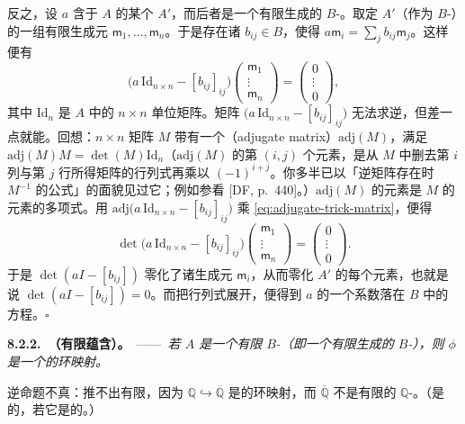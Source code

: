 反之，设 $a$ 含于 $A$ 的某个\trSubalgebra{} $A'$，而后者是一个有限生成的 $B$-\trModule。取定 $A'$（作为 $B$-\trModule）的一组有限生成元 $\mathsf{m}_1,\dots,\mathsf{m}_n$。于是存在诸 $b_{ij}\in B$，使得 $a\mathsf{m}_i=\sum_j b_{ij}\mathsf{m}_j$。这样便有
\begin{equation*}\tag{8.2.1.1}\label{eq:adjugate-trick-matrix}
\bigl(a\,\mathrm{Id}_{n\times n}-[b_{ij}]_{ij}\bigr)
\begin{pmatrix}\mathsf{m}_1\\ \vdots\\ \mathsf{m}_n\end{pmatrix}
=
\begin{pmatrix}0\\ \vdots\\ 0\end{pmatrix},
\end{equation*}
其中 $\mathrm{Id}_n$ 是 $A$ 中的 $n\times n$ 单位矩阵。矩阵 $\bigl(a\,\mathrm{Id}_{n\times n}-[b_{ij}]_{ij}\bigr)$ 无法求逆，但差一点就能。回想：$n\times n$ 矩阵 $M$ 带有一个\emph{\trAdjugateMatrix{}}（adjugate matrix）$\mathrm{adj}(M)$，满足 $\mathrm{adj}(M)M=\det(M)\mathrm{Id}_n$（$\mathrm{adj}(M)$ 的第 $(i,j)$ 个元素，是从 $M$ 中删去第 $i$ 列与第 $j$ 行所得矩阵的行列式再乘以 $(-1)^{i+j}$。你多半已以「逆矩阵存在时 $M^{-1}$ 的公式」的面貌见过它；例如参看 [DF, p.~440]。）$\mathrm{adj}(M)$ 的元素是 $M$ 的元素的多项式。用 $\mathrm{adj}\bigl(a\,\mathrm{Id}_{n\times n}-[b_{ij}]_{ij}\bigr)$ 乘 \eqref{eq:adjugate-trick-matrix}，便得
\[
\det\bigl(a\,\mathrm{Id}_{n\times n}-[b_{ij}]_{ij}\bigr)
\begin{pmatrix}\mathsf{m}_1\\ \vdots\\ \mathsf{m}_n\end{pmatrix}
=
\begin{pmatrix}0\\ \vdots\\ 0\end{pmatrix}.
\]
于是 $\det(aI-[b_{ij}])$ 零化了诸生成元 $\mathsf{m}_i$，从而零化 $A'$ 的每个元素，也就是说 $\det(aI-[b_{ij}])=0$。而把行列式展开，便得到 $a$ 的一个系数落在 $B$ 中的\trIntegrality{}方程。\hfill$\square$

\textbf{8.2.2.\ \trhCorollary{}（有限蕴含\trIntegral）。}\ ——\ \emph{若 $A$ 是一个有限 $B$-\trAlgebra（即一个有限生成的 $B$-\trModule），则 $\phi$ 是一个\trIntegral{}的环映射。}

逆命题不真：\trIntegral{}推不出有限，因为 $\mathbb{Q}\hookrightarrow\overline{\mathbb{Q}}$ 是\trIntegral{}的环映射，而 $\overline{\mathbb{Q}}$ 不是有限的 $\mathbb{Q}$-\trModule。（\trFieldExtension{}是\trIntegral{}的，若它是\trAlgebraic{}的。）

